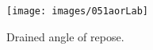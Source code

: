 \begin{figure}[!htb]
\centering
\texttt{[image: images/051aorLab]}
\caption[AoR]{Drained angle of repose.}
\label{fig:051aorLab}
\end{figure}